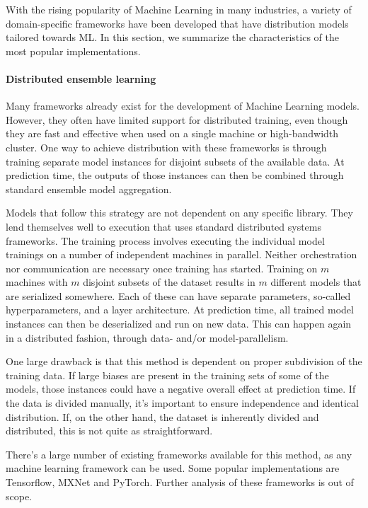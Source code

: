 With the rising popularity of Machine Learning in many industries, a variety of domain-specific frameworks have been developed that have distribution models tailored towards ML. In this section, we summarize the characteristics of the most popular implementations.

\paragraph{Distributed ensemble learning}
Many frameworks already exist for the development of Machine Learning models. However, they often have limited support for distributed training, even though they are fast and effective when used on a single machine or high-bandwidth cluster. One way to achieve distribution with these frameworks is through training separate model instances for disjoint subsets of the available data. At prediction time, the outputs of those instances can then be combined through standard ensemble model aggregation\citep{Opitz1999}.

Models that follow this strategy are not dependent on any specific library. They lend themselves well to execution that uses standard distributed systems frameworks. The training process involves executing the individual model trainings on a number of independent machines in parallel. Neither orchestration nor communication are necessary once training has started. Training on $m$ machines with $m$ disjoint subsets of the dataset results in $m$ different models that are serialized somewhere. Each of these can have separate parameters, so-called hyperparameters, and a layer architecture. At prediction time, all trained model instances can then be deserialized and run on new data. This can happen again in a distributed fashion, through data- and/or model-parallelism.

One large drawback is that this method is dependent on proper subdivision of the training data. If large biases are present in the training sets of some of the models, those instances could have a negative overall effect at prediction time. If the data is divided manually, it's important to ensure independence and identical distribution. If, on the other hand, the dataset is inherently divided and distributed, this is not quite as straightforward.

There's a large number of existing frameworks available for this method, as any machine learning framework can be used. Some popular implementations are Tensorflow\citep{Tensorflow2015}, MXNet\citep{MXNet2015} and PyTorch\citep{PyTorch2017}. Further analysis of these frameworks is out of scope.

